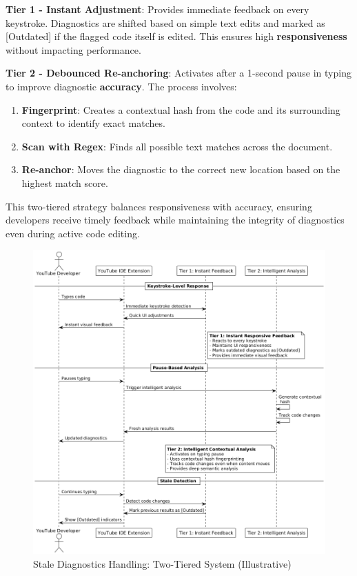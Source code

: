 \begin{spacing}{1.2}
\textbf{Tier 1 - Instant Adjustment}: Provides immediate feedback on every keystroke. Diagnostics are shifted based on simple text edits and marked as [Outdated] if the flagged code itself is edited. This ensures high \textbf{responsiveness} without impacting performance.  

\textbf{Tier 2 - Debounced Re-anchoring}: Activates after a 1-second pause in typing to improve diagnostic \textbf{accuracy}. The process involves:  
\begin{enumerate}
    \item \textbf{Fingerprint}: Creates a contextual hash from the code and its surrounding context to identify exact matches.  
    \item \textbf{Scan with Regex}: Finds all possible text matches across the document.  
    \item \textbf{Re-anchor}: Moves the diagnostic to the correct new location based on the highest match score.  
\end{enumerate}  
This two-tiered strategy balances responsiveness with accuracy, ensuring developers receive timely feedback while maintaining the integrity of diagnostics even during active code editing.


\begin{figure}[H]
    \centering
    \includegraphics[scale=0.6]{Images/stale_diagnostics.png}
    \caption{Stale Diagnostics Handling: Two-Tiered System (Illustrative)}
    \label{fig:stale_diagnostics_method}
\end{figure}


\end{spacing}
